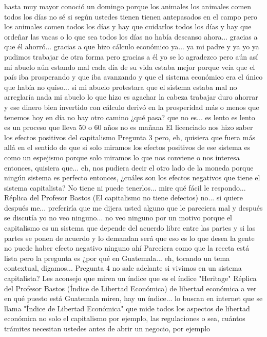 hasta muy mayor conoció un domingo porque los animales los animales comen todos los días
no sé si según ustedes tienen tienen antepasados en el campo pero los animales comen todos los días y hay que cuidarlos todos los días
y hay que ordeñar las vacas o lo que sea todos los días no había descanso ahora... gracias a que él ahorró...
gracias a que hizo cálculo económico ya... ya mi padre y ya yo ya pudimos trabajar de otra forma
pero gracias a él yo se lo agradezco pero aún así mi abuelo aún estando mal cada día de su vida estaba mejor
porque veía que el país iba prosperando y que iba avanzando y que el sistema económico era el único que había
no quiso... si mi abuelo protestara que el sistema estaba mal no arreglaría nada mi abuelo lo que hizo es agachar la cabeza
trabajar duro ahorrar y ese dinero bien invertido con cálculo derivó en la prosperidad más o menos
que tenemos hoy en día no hay otro camino ¿qué pasa? que no es... es lento es lento es un proceso que lleva 50 o 60 años
no es mañana El licenciado nos hizo saber los efectos positivos del capitalismo
Pregunta 3
pero, eh, quisiera que fuera más allá en el sentido de que
si solo miramos los efectos positivos de ese sistema es como un espejismo porque solo miramos
lo que nos conviene o nos interesa entonces, quisiera que... eh, nos pudiera decir
el otro lado de la moneda porque ningún sistema es perfecto entonces, ¿cuáles son los efectos negativos
que tiene el sistema capitalista? No tiene ni puede tenerlos... mire qué fácil le respondo...
Réplica del Profesor Bastos (El capitalismo no tiene defectos)
no... si quiere después me... preferiría que me dijera usted alguno que le pareciera mal y después se discutía yo no veo ninguno...
no veo ninguno por un motivo porque el capitalismo es un sistema que depende del acuerdo libre entre las partes y si las partes se ponen de acuerdo
y lo demandan será que eso es lo que desea la gente no puede haber efecto negativo ninguno ahí
Pareciera como que la receta está lista pero la pregunta es ¿por qué en Guatemala... eh, tocando un tema contextual, digamos...
Pregunta 4
no sale adelante si vivimos en un sistema capitalista? Les aconsejo que miren un índice que es el índice "Heritage"
Réplica del Profesor Bastos (Índice de Libertad Económica)
de libertad económica a ver en qué puesto está Guatemala miren, hay un índice... lo buscan en internet
que se llama "Índice de Libertad Económica" que mide todos los aspectos de libertad económica no solo el capitalismo
por ejemplo, las regulaciones o sea, cuántos trámites necesitan ustedes antes de abrir un negocio, por ejemplo
